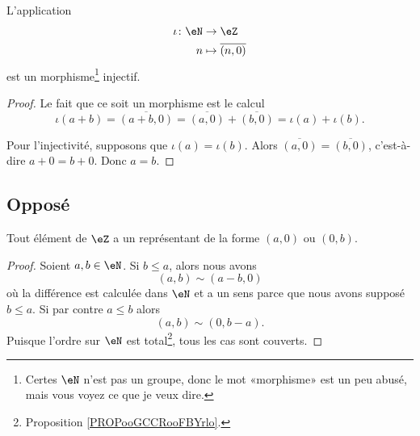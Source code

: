 \begin{proposition}
    L'application
    \begin{equation}
        \begin{aligned}
            \iota\colon \eN&\to \eZ \\
            n&\mapsto \overline{ (n,0) } 
        \end{aligned}
    \end{equation}
    est un morphisme\footnote{Certes \( \eN\) n'est pas un groupe, donc le mot «morphisme» est un peu abusé, mais vous voyez ce que je veux dire.} injectif.
\end{proposition}

\begin{proof}
    Le fait que ce soit un morphisme est le calcul
    \begin{equation}
        \iota(a+b)=\overline{ (a+b,0) }=\overline{ (a,0) }+\overline{ (b,0) }=\iota(a)+\iota(b).
    \end{equation}

    Pour l'injectivité, supposons que \( \iota(a)=\iota(b)\). Alors \( \overline{ (a,0) }=\overline{ (b,0) }\), c'est-à-dire \( a+0=b+0\). Donc \( a=b\).
\end{proof}


\subsection{Opposé}

\begin{lemma}       \label{LEMooSABNooZZDIes}
    Tout élément de \( \eZ\) a un représentant de la forme \( (a,0)\) ou \( (0,b)\).
\end{lemma}

\begin{proof}
    Soient \( a,b\in \eN\). Si \( b\leq a\), alors nous avons
    \begin{equation}
        (a,b)\sim(a-b,0)
    \end{equation}
    où la différence est calculée dans \( \eN\) et a un sens parce que nous avons supposé \( b\leq a\). Si par contre \( a\leq b\) alors
    \begin{equation}
        (a,b)\sim(0,b-a).
    \end{equation}
    Puisque l'ordre sur \( \eN\) est total\footnote{Proposition \ref{PROPooGCCRooFBYrlo}.}, tous les cas sont couverts.
\end{proof}


